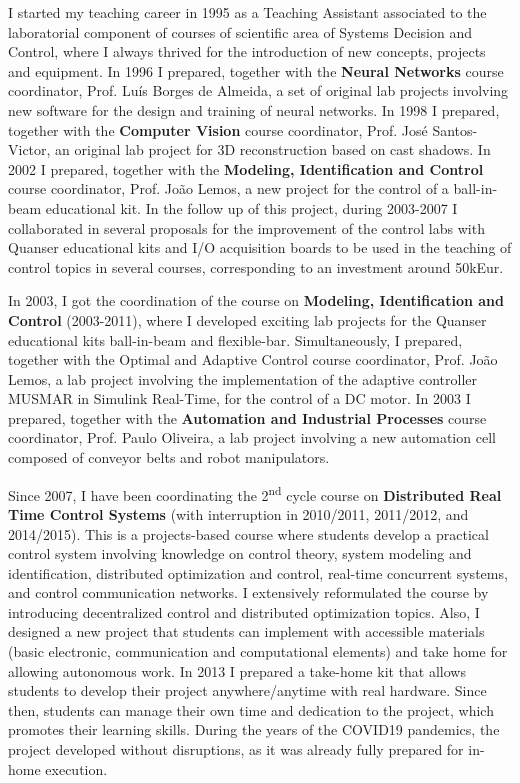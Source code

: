 I started my teaching career in 1995 as a Teaching Assistant associated
to the laboratorial component of courses of scientific area of Systems
Decision and Control, where I always thrived for the introduction of new
concepts, projects and equipment. In 1996 I prepared, together with the
\textbf{Neural Networks} course coordinator, Prof. Luís Borges de
Almeida, a set of original lab projects involving new software for the
design and training of neural networks. In 1998 I prepared, together
with the \textbf{Computer Vision} course coordinator, Prof. José
Santos-Victor, an original lab project for 3D reconstruction based on
cast shadows. In 2002 I prepared, together with the \textbf{Modeling,
Identification and Control} course coordinator, Prof. João Lemos, a new
project for the control of a ball-in-beam educational kit. In the follow
up of this project, during 2003-2007 I collaborated in several proposals
for the improvement of the control labs with Quanser educational kits
and I/O acquisition boards to be used in the teaching of control topics
in several courses, corresponding to an investment around 50kEur.

In 2003, I got the coordination of the course on \textbf{Modeling,
Identification and Control} (2003-2011), where I developed exciting lab
projects for the Quanser educational kits ball-in-beam and flexible-bar.
Simultaneously, I prepared, together with the Optimal and Adaptive
Control course coordinator, Prof. João Lemos, a lab project involving
the implementation of the adaptive controller MUSMAR in Simulink
Real-Time, for the control of a DC motor. In 2003 I prepared, together
with the \textbf{Automation and Industrial Processes} course
coordinator, Prof. Paulo Oliveira, a lab project involving a new
automation cell composed of conveyor belts and robot manipulators.

Since 2007, I have been coordinating the 2\textsuperscript{nd} cycle
course on \textbf{Distributed Real Time Control Systems} (with
interruption in 2010/2011, 2011/2012, and 2014/2015). This is a
projects-based course where students develop a practical control system
involving knowledge on control theory, system modeling and
identification, distributed optimization and control, real-time
concurrent systems, and control communication networks. I extensively
reformulated the course by introducing decentralized control and
distributed optimization topics. Also, I designed a new project that
students can implement with accessible materials (basic electronic,
communication and computational elements) and take home for allowing
autonomous work. In 2013 I prepared a take-home kit that allows students
to develop their project anywhere/anytime with real hardware. Since
then, students can manage their own time and dedication to the project,
which promotes their learning skills. During the years of the COVID19
pandemics, the project developed without disruptions, as it was already
fully prepared for in-home execution.

